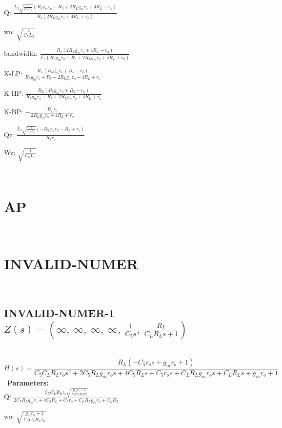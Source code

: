 \documentclass{article}
\begin{document}
Q: $\frac{L_{5} \sqrt{\frac{1}{C_{5} L_{5}}} \left(R_{5} g_{m} r_{o} + R_{5} + 2 R_{L} g_{m} r_{o} + 4 R_{L} + r_{o}\right)}{R_{5} \left(2 R_{L} g_{m} r_{o} + 4 R_{L} + r_{o}\right)}$\ 

wo: $\sqrt{\frac{1}{C_{5} L_{5}}}$\ 

bandwidth: $\frac{R_{5} \left(2 R_{L} g_{m} r_{o} + 4 R_{L} + r_{o}\right)}{L_{5} \left(R_{5} g_{m} r_{o} + R_{5} + 2 R_{L} g_{m} r_{o} + 4 R_{L} + r_{o}\right)}$\ 

K-LP: $\frac{R_{L} \left(R_{5} g_{m} r_{o} + R_{5} - r_{o}\right)}{R_{5} g_{m} r_{o} + R_{5} + 2 R_{L} g_{m} r_{o} + 4 R_{L} + r_{o}}$\ 

K-HP: $\frac{R_{L} \left(R_{5} g_{m} r_{o} + R_{5} - r_{o}\right)}{R_{5} g_{m} r_{o} + R_{5} + 2 R_{L} g_{m} r_{o} + 4 R_{L} + r_{o}}$\ 

K-BP: $- \frac{R_{L} r_{o}}{2 R_{L} g_{m} r_{o} + 4 R_{L} + r_{o}}$\ 

Qz: $\frac{L_{5} \sqrt{\frac{1}{C_{5} L_{5}}} \left(- R_{5} g_{m} r_{o} - R_{5} + r_{o}\right)}{R_{5} r_{o}}$\ 

Wz: $\sqrt{\frac{1}{C_{5} L_{5}}}$\ 

\ 

\section{AP}\ 
\section{INVALID-NUMER}\ 
\subsection{INVALID-NUMER-1 $Z(s) = \left( \infty, \  \infty, \  \infty, \  \infty, \  \frac{1}{C_{5} s}, \  \frac{R_{L}}{C_{L} R_{L} s + 1}\right)$ } \ 
\textbf{\[H(s) = \frac{R_{L} \left(- C_{5} r_{o} s + g_{m} r_{o} + 1\right)}{C_{5} C_{L} R_{L} r_{o} s^{2} + 2 C_{5} R_{L} g_{m} r_{o} s + 4 C_{5} R_{L} s + C_{5} r_{o} s + C_{L} R_{L} g_{m} r_{o} s + C_{L} R_{L} s + g_{m} r_{o} + 1}\] } \ 
\textbf{Parameters:}\\ 

Q: $\frac{C_{5} C_{L} R_{L} r_{o} \sqrt{\frac{g_{m} r_{o} + 1}{C_{5} C_{L} R_{L} r_{o}}}}{2 C_{5} R_{L} g_{m} r_{o} + 4 C_{5} R_{L} + C_{5} r_{o} + C_{L} R_{L} g_{m} r_{o} + C_{L} R_{L}}$\ 

wo: $\sqrt{\frac{g_{m} r_{o} + 1}{C_{5} C_{L} R_{L} r_{o}}}$\ 
\end{document}
